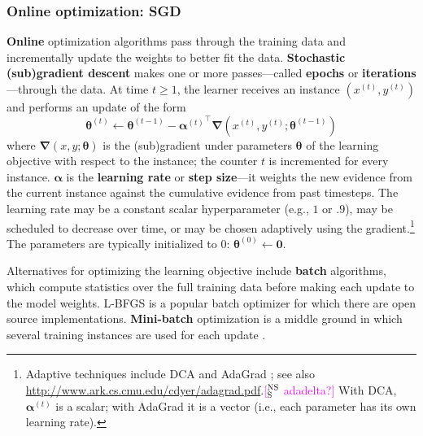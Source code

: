 \documentclass[11pt,letterpaper]{article}
\newcommand{\ensuretext}[1]{#1}
\newcommand{\nssmarker}{\ensuretext{\textcolor{magenta}{\ensuremath{^{\textsc{NS}}_{\textsc{S}}}}}}
\newcommand{\arkcomment}[3]{\ensuretext{\textcolor{#3}{[#1 #2]}}}
\newcommand{\nss}[1]{\arkcomment{\nssmarker}{#1}{magenta}}
\begin{document}


\subsubsection{Online optimization: SGD}\label{sec:online}

\textbf{Online} optimization algorithms pass through the training data and incrementally update 
the weights to better fit the data.
\textbf{Stochastic (sub)gradient descent} \citep[SGD;][]{sgd} makes one or more passes---called \textbf{epochs} or \textbf{iterations}---through the data. 
At time $t \geq 1$, the learner receives an instance $(x^{(t)},y^{(t)})$ and performs an update of the form
\begin{equation}\label{eq:sgd}
\boldsymbol{\theta}^{(t)} \leftarrow \boldsymbol{\theta}^{(t-1)} - {\boldsymbol{\alpha}^{(t)}}^{\top} \boldsymbol{\nabla}(x^{(t)},y^{(t)};\boldsymbol{\theta}^{(t-1)})
\end{equation}
where $\boldsymbol{\nabla}(x,y; \boldsymbol{\theta})$ is the (sub)gradient under parameters $\boldsymbol{\theta}$ 
of the learning objective with respect to the instance; the counter $t$ is incremented for every instance.
$\boldsymbol{\alpha}$ is the \textbf{learning rate} or \textbf{step size}---it weights the new evidence 
from the current instance against the cumulative evidence from past timesteps.
The learning rate may be a constant scalar hyperparameter (e.g., $1$ or $.9$), may be scheduled to decrease over time, 
or may be chosen adaptively using the gradient.\footnote{\label{fn:adaptive}Adaptive techniques include DCA \citep{martins-10} 
and AdaGrad \citep{adagrad}; see also \url{http://www.ark.cs.cmu.edu/cdyer/adagrad.pdf}.\nss{adadelta?}
With DCA, $\boldsymbol{\alpha}^{(t)}$ is a scalar; with AdaGrad it is a vector (i.e., each parameter has its own learning rate).}
The parameters are typically initialized to 0: $\boldsymbol{\theta}^{(0)} \leftarrow \mathbf{0}$.

Alternatives for optimizing the learning objective include 
\textbf{batch} algorithms, which compute statistics over the full training data 
before making each update to the model weights. 
L-BFGS \citep{lbfgs} is a popular batch optimizer for which there are open source implementations.
\textbf{Mini-batch} optimization is a middle ground in which several training instances 
are used for each update \citep[p.~175]{smith}.
\end{document}
